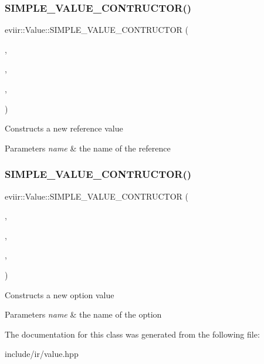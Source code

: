 \subsubsection{\texorpdfstring{S\+I\+M\+P\+L\+E\+\_\+\+V\+A\+L\+U\+E\+\_\+\+C\+O\+N\+T\+R\+U\+C\+T\+O\+R()}{SIMPLE\_VALUE\_CONTRUCTOR()}\hspace{0.1cm}{\footnotesize\ttfamily [6/7]}}
{\footnotesize\ttfamily eviir\+::\+Value\+::\+S\+I\+M\+P\+L\+E\+\_\+\+V\+A\+L\+U\+E\+\_\+\+C\+O\+N\+T\+R\+U\+C\+T\+OR (\begin{DoxyParamCaption}\item[{\hyperlink{classeviir_1_1ReferenceValue}{Reference\+Value}}]{,  }\item[{reference}]{,  }\item[{string}]{,  }\item[{name}]{ }\end{DoxyParamCaption})}

Constructs a new reference value 
\begin{DoxyParams}{Parameters}
{\em name} & the name of the reference \\
\hline
\end{DoxyParams}
\mbox{\label{classeviir_1_1Value_ad872325f078f87de60adbeae6eab8f98}} 
\subsubsection{\texorpdfstring{S\+I\+M\+P\+L\+E\+\_\+\+V\+A\+L\+U\+E\+\_\+\+C\+O\+N\+T\+R\+U\+C\+T\+O\+R()}{SIMPLE\_VALUE\_CONTRUCTOR()}\hspace{0.1cm}{\footnotesize\ttfamily [7/7]}}
{\footnotesize\ttfamily eviir\+::\+Value\+::\+S\+I\+M\+P\+L\+E\+\_\+\+V\+A\+L\+U\+E\+\_\+\+C\+O\+N\+T\+R\+U\+C\+T\+OR (\begin{DoxyParamCaption}\item[{\hyperlink{classeviir_1_1OptionValue}{Option\+Value}}]{,  }\item[{option}]{,  }\item[{string}]{,  }\item[{name}]{ }\end{DoxyParamCaption})}

Constructs a new option value 
\begin{DoxyParams}{Parameters}
{\em name} & the name of the option \\
\hline
\end{DoxyParams}


The documentation for this class was generated from the following file\+:\begin{DoxyCompactItemize}
\item 
include/ir/value.\+hpp\end{DoxyCompactItemize}
